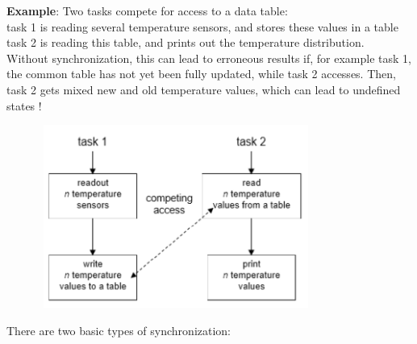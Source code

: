 \textbf{ Example}: Two tasks compete for access to a data table:\\

task 1 is reading several temperature sensors, and stores these values in a table\\
task 2 is reading this table, and prints out the temperature distribution.\\

Without synchronization, this can lead to erroneous results if, for example task 1, the common table has not yet been fully updated, while task 2 accesses. Then, task 2 gets mixed new and old temperature values, which can lead to undefined states !

 	\begin{figure}[h]
    \centering
    \includegraphics[width=9cm, height=6cm]{Images/image102.png}
    \label{fig:Fig 48}
    \end{figure}

\newpage  
There are two basic types of synchronization:

